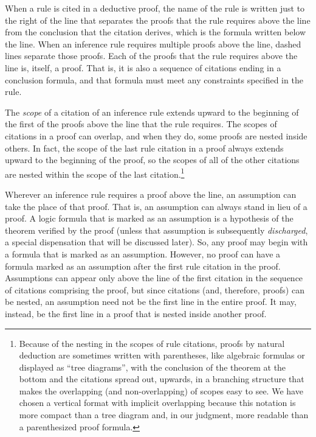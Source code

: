 When a rule is
cited in a deductive proof,
the name of the rule is written just to the right of
the line that separates the proofs that the rule requires above the line
from the conclusion that the citation derives,
which is the formula written below the line.
When an inference rule requires multiple proofs above the line,
dashed lines separate those proofs.
Each of the proofs that the rule requires above the line
is, itself, a proof.
That is, it is also a sequence of citations ending in a conclusion formula,
and that formula must meet any constraints
specified in the rule.

The \emph{scope} of a
citation of an inference rule
extends upward to the beginning of the first of the proofs
above the line that the rule requires.
The scopes of citations in a proof can overlap,
and when they do, some proofs are nested inside others.
In fact, the scope of the last rule citation in a proof
always extends upward to the beginning of the proof,
so the scopes of all of the other citations are nested
within the scope of the last citation.\footnote{Because
of the nesting in the scopes of rule citations,
proofs by natural deduction
are sometimes written with parentheses,
like algebraic formulas
or displayed as ``tree diagrams'',
with the conclusion of the theorem at the bottom and
the citations spread out, upwards,
in a branching structure
that makes the overlapping (and non-overlapping)
of scopes easy to see.
We have chosen a vertical format with implicit
overlapping because this notation is more compact than a
tree diagram and, in our judgment,
more readable than a parenthesized proof formula.}

Wherever an inference rule requires a proof above the line,
an assumption can take the place of that proof.
That is,
an assumption can always stand in lieu of a proof.
A logic formula that is marked as an assumption
is a hypothesis of the theorem verified by the proof
(unless that assumption is subsequently \emph{discharged},
a special dispensation
that will be discussed later).
So, any proof may begin with a formula
that is marked as an assumption.
However, no proof can have
a formula marked as an assumption after
the first rule citation in the proof.
Assumptions can appear only above the line
of the first citation in the sequence of citations
comprising the proof, but since citations
(and, therefore, proofs) can be nested,
an assumption need not be the first line in
the entire proof.
It may, instead, be the first line
in a proof that is nested inside another proof.

